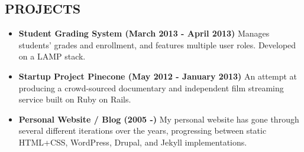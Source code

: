 \documentclass[line, overlapped]{res}
\begin{document}
\begin{resume}



    \section{PROJECTS}

    \begin{itemize}[leftmargin=10pt]
        \item \textbf{Student Grading System (March 2013 - April 2013)} Manages students' grades and enrollment, and features multiple user roles. Developed on a LAMP stack.
        \item \textbf{Startup Project Pinecone (May 2012 - January 2013)} An attempt at producing a crowd-sourced documentary and independent film streaming service built on Ruby on Rails.
        \item \textbf{Personal Website / Blog (2005 -)} My personal website has gone through several different iterations over the years, progressing between static HTML+CSS, WordPress, Drupal, and Jekyll implementations.
    \end{itemize}

\end{resume}
\end{document}
